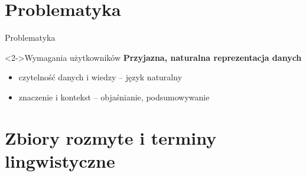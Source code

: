 \documentclass{beamer}
\begin{document}
\section{Problematyka}
\begin{frame}{Problematyka}%

\begin{block}<2->{Wymagania użytkowników}
	{\color{blue}\bfseries Przyjazna, naturalna reprezentacja danych}
	\begin{itemize}
		\item czytelność danych i wiedzy -- {\color{blue}język naturalny} 
		\item znaczenie i kontekst -- {\color{blue} objaśnianie, podsumowywanie}
	\end{itemize}
\end{block}

\end{frame}


\section{Zbiory rozmyte i terminy lingwistyczne}
\end{document}

